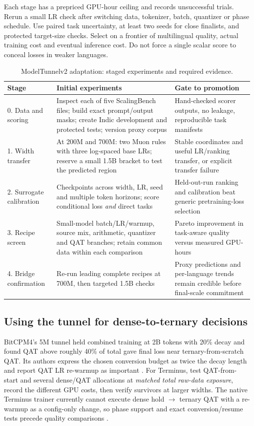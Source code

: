 \documentclass[10pt,a4paper]{article}
\begin{document}
Each stage has a prepriced GPU-hour ceiling and records unsuccessful trials. Rerun a small LR check after switching data, tokenizer, batch, quantizer or phase schedule. Use paired task uncertainty, at least two seeds for close finalists, and protected target-size checks. Select on a frontier of multilingual quality, actual training cost and eventual inference cost. Do not force a single scalar score to conceal losses in weaker languages.

\begin{table}[ht]
\centering\small
\caption{ModelTunnelv2 adaptation: staged experiments and required evidence.}
\label{tab:stages}
\begin{tabularx}{\linewidth}{@{}p{33mm}p{69mm}X@{}}
\toprule
Stage & Initial experiments & Gate to promotion \\
\midrule
0. Data and scoring & Inspect each of five ScalingBench files; build exact prompt/output masks; create Indic development and protected tests; version proxy corpus & Hand-checked scorer outputs, no leakage, reproducible task manifests \\
1. Width transfer & At 200M and 700M: two Muon rules with three log-spaced base LRs; reserve a small 1.5B bracket to test the predicted region & Stable coordinates and useful LR/ranking transfer, or explicit transfer failure \\
2. Surrogate calibration & Checkpoints across width, LR, seed and multiple token horizons; score conditional loss \emph{and} direct tasks & Held-out-run ranking and calibration beat generic pretraining-loss selection \\
3. Recipe screen & Small-model batch/LR/warmup, source mix, arithmetic, quantizer and QAT branches; retain common data within each comparison & Pareto improvement in task-aware quality versus measured GPU-hours \\
4. Bridge confirmation & Re-run leading complete recipes at 700M, then targeted 1.5B checks & Proxy predictions and per-language trends remain credible before final-scale commitment \\
\bottomrule
\end{tabularx}
\end{table}

\subsection{Using the tunnel for dense-to-ternary decisions}

BitCPM4's 5M tunnel held combined training at 2B tokens with 20\% decay and found QAT above roughly 40\% of total gave final loss near ternary-from-scratch QAT. Its authors express the chosen conversion budget as twice the decay length and report QAT LR re-warmup as important \cite{minicpm4}. For Terminus, test QAT-from-start and several dense/QAT allocations at \emph{matched total raw-data exposure}, record the different GPU costs, then verify survivors at larger widths. The native Terminus trainer currently cannot execute dense hold $\rightarrow$ ternary QAT with a re-warmup as a config-only change, so phase support and exact conversion/resume tests precede quality comparisons \cite{local}.
\end{document}
